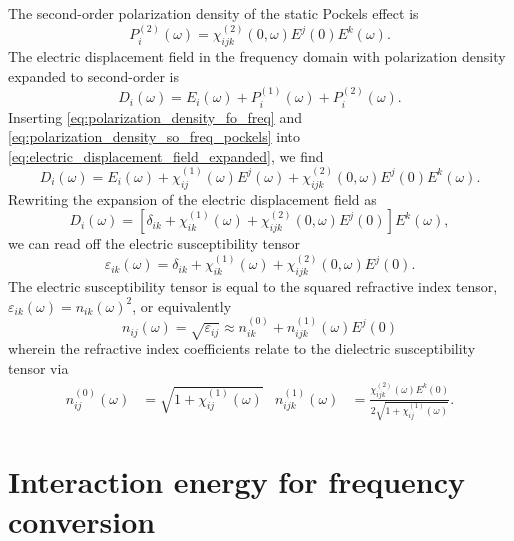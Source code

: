 The second-order polarization density of the static Pockels effect is~\cite[p.~495]{Boyd2020}
\begin{equation}
	P_i^{(2)}(\omega)
	=
	\chi^{(2)}_{ijk}(0,\omega)
	E^j(0)
	E^k(\omega)
	.
	\label{eq:polarization_density_so_freq_pockels}
\end{equation}
The electric displacement field in the frequency domain with polarization density expanded to second-order is~\cite[p.~1070]{Mandel1995}
\begin{equation}
	D_i(\omega)
	=
	E_i(\omega)
	+
	P_i^{(1)}(\omega)
	+
	P_i^{(2)}(\omega)
	.
	\label{eq:electric_displacement_field_expanded}
\end{equation}
Inserting \cref{eq:polarization_density_fo_freq} and \cref{eq:polarization_density_so_freq_pockels} into \cref{eq:electric_displacement_field_expanded}, we find
\begin{equation}
	D_i(\omega)
	=
	E_i(\omega)
	+
	\chi^{(1)}_{ij}(\omega)
	E^j(\omega)
	+
	\chi^{(2)}_{ijk}(0,\omega)
	E^j(0)
	E^k(\omega)
	.
\end{equation}
Rewriting the expansion of the electric displacement field as
\begin{equation}
	D_i(\omega)
	=
	\left[
		\delta_{ik}
		+
		\chi^{(1)}_{ik}(\omega)
		+
		\chi^{(2)}_{ijk}(0,\omega)
		E^j(0)
	\right]
	E^k(\omega)
	,
\end{equation}
we can read off the electric susceptibility tensor
\begin{equation}
	\varepsilon_{ik}(\omega)
	=
	\delta_{ik}
	+
	\chi^{(1)}_{ik}(\omega)
	+
	\chi^{(2)}_{ijk}(0,\omega)
	E^j(0)
	.
\end{equation}
The electric susceptibility tensor is equal to the squared refractive index tensor, $\varepsilon_{ik}(\omega)=n_{ik}(\omega)^2$, or equivalently~\cite[p.~3]{Brooker2003}
\begin{equation}
	n_{ij}(\omega)
	=
	\sqrt{\varepsilon_{ij}}
	\approx
	n_{ik}^{(0)}
	+
	n_{ijk}^{(1)}(\omega)
	E^j(0)
\end{equation}
wherein the refractive index coefficients relate to the dielectric susceptibility tensor via~\cite{Rerat2020}
\begin{align}
	n^{(0)}_{ij}(\omega)
	&=
	\sqrt{1+\chi^{(1)}_{ij}(\omega)}
	&
	n^{(1)}_{ijk}(\omega)
	&=
	\frac{\chi^{(2)}_{ijk}(\omega)
	E^k(0)}{2\sqrt{1+\chi^{(1)}_{ij}(\omega)}}
	.
\end{align}

\section{Interaction energy for frequency conversion}

